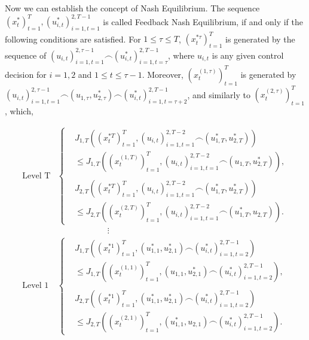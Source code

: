 \documentclass[letterpaper, 10 pt, conference]{ieeeconf}  %
\begin{document}
Now we can establish the concept of Nash Equilibrium.
The sequence $(x_{t}^{*})_{t=1}^{T},(u_{i,t}^{*})_{i=1,t=1}^{2,T-1}$ is called Feedback Nash Equilibrium, if and only if the following conditions are satisfied. For $1 \leq \tau \leq T$, $(x_{t}^{*\tau})_{t=1}^{T}$ is generated by the sequence of $(u_{i,t})_{i=1,t=1}^{2,\tau-1} \frown (u_{i,t}^{*})_{i=1,t=\tau}^{2,T-1}$, where $u_{i,t}$ is any given control decision for $i = 1,2$ and $1 \leq t \leq \tau-1$. Moreover, $(x_{t}^{(1,\tau)})_{t=1}^{T}$ is generated by $(u_{i,t})_{i=1,t=1}^{2,\tau-1} \frown (u_{1,\tau},u_{2,\tau}^{*}) \frown (u_{i,t}^{*})_{i=1,t=\tau+2}^{2,T-1}$, and similarly to $(x_{t}^{(2,\tau)})_{t=1}^{T}$, which,

\begin{equation}\label{eq:nashIneq}
    \begin{split}
        \text{Level T}
        &\begin{cases}
            &J_{1,T}((x_{t}^{*T})_{t=1}^{T}, (u_{i,t})_{i=1,t=1}^{2,T-2} \frown (u_{1,T}^{*},u_{2,T}^{*})) \\ & \leq J_{1,T}((x_{t}^{(1,T)})_{t=1}^{T}, (u_{i,t})_{i=1,t=1}^{2,T-2} \frown (u_{1,T},u_{2,T}^{*})),\\ \\
            &J_{2,T}((x_{t}^{*T})_{t=1}^{T}, (u_{i,t})_{i=1,t=1}^{2,T-2} \frown (u_{1,T}^{*},u_{2,T}^{*})) \\ & \leq J_{2,T}((x_{t}^{(2,T)})_{t=1}^{T}, (u_{i,t})_{i=1,t=1}^{2,T-2} \frown (u_{1,T}^{*},u_{2,T})).
        \end{cases}
    \\ &\qquad \qquad \qquad \vdots \\
    \text{Level 1}
        &\begin{cases}
            &J_{1,T}((x_{t}^{*1})_{t=1}^{T}, (u_{1,1}^{*},u_{2,1}^{*}) \frown (u_{i,t}^{*})_{i=1,t=2}^{2,T-1}) \\ & \leq J_{1,T}((x_{t}^{(1,1)})_{t=1}^{T}, (u_{1,1},u_{2,1}^{*}) \frown (u_{i,t}^{*})_{i=1,t=2}^{2,T-1}),\\ \\
            &J_{2,T}((x_{t}^{*1})_{t=1}^{T}, (u_{1,1}^{*},u_{2,1}^{*}) \frown (u_{i,t}^{*})_{i=1,t=2}^{2,T-1}) \\ & \leq J_{2,T}((x_{t}^{(2,1)})_{t=1}^{T}, (u_{1,1}^{*},u_{2,1}) \frown (u_{i,t}^{*})_{i=1,t=2}^{2,T-1}).
        \end{cases}
    \end{split}
\end{equation}
\end{document}
